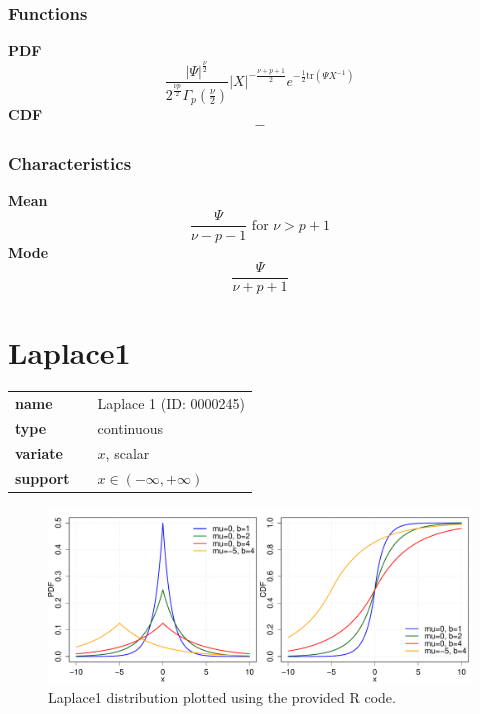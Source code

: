 \subsubsection*{Functions}

\smallskip \noindent \hspace{.2cm} \textbf{PDF} 
\begin{equation*}\frac{\left|\Psi\right|^{\frac{\nu}{2}}}{2^{\frac{\nu p}{2}}\Gamma_p(\frac{\nu}{2})} \left|X\right|^{-\frac{\nu+p+1}{2}}e^{-\frac{1}{2}\text{tr}(\Psi X^{-1})}\end{equation*}
\smallskip \noindent \hspace{.2cm} \textbf{CDF} 
\begin{equation*}-\end{equation*}
\smallskip
\subsubsection*{Characteristics}
\smallskip \noindent \hspace{.2cm} \textbf{Mean} 
\begin{equation*}\frac{\Psi}{\nu - p - 1} \text{ for }\nu > p + 1\end{equation*}
\smallskip \noindent \hspace{.2cm} \textbf{Mode} 
\begin{equation*}\frac{\Psi}{\nu + p + 1}\end{equation*}
\smallskip
\section*{Laplace1} 

  \bigskip 

\begin{tabular}{p{2cm}cl}
\textbf{name} & & Laplace 1 (ID: 0000245)\\ 
 
\textbf{type} & & continuous \\ 

\textbf{variate} & & $x$, scalar \\ 

\textbf{support} & & $x \in (-\infty,+\infty)$
\end{tabular}

\begin{figure}[ht!]
\centering
  \includegraphics[width=140mm]{pics/Laplace1.pdf}
 \caption{Laplace1 distribution plotted using the provided R code.}
 \label{fig:Laplace1}
\end{figure}


